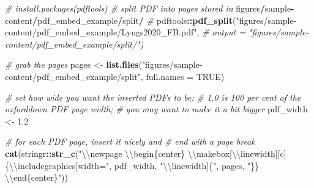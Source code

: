 \documentclass[a4paper, twoside]{templates/ociamthesis}
\newenvironment{Shaded}{\begin{snugshade}}{\end{snugshade}}
\newcommand{\CharTok}[1]{\textcolor[rgb]{0.31,0.60,0.02}{#1}}
\newcommand{\CommentTok}[1]{\textcolor[rgb]{0.56,0.35,0.01}{\textit{#1}}}
\newcommand{\DataTypeTok}[1]{\textcolor[rgb]{0.13,0.29,0.53}{#1}}
\newcommand{\FloatTok}[1]{\textcolor[rgb]{0.00,0.00,0.81}{#1}}
\newcommand{\KeywordTok}[1]{\textcolor[rgb]{0.13,0.29,0.53}{\textbf{#1}}}
\newcommand{\NormalTok}[1]{#1}
\newcommand{\OperatorTok}[1]{\textcolor[rgb]{0.81,0.36,0.00}{\textbf{#1}}}
\newcommand{\OtherTok}[1]{\textcolor[rgb]{0.56,0.35,0.01}{#1}}
\newcommand{\StringTok}[1]{\textcolor[rgb]{0.31,0.60,0.02}{#1}}
\renewenvironment{Shaded}
{
  \vspace{10pt}%
  \begin{snugshade}%
}{%
  \end{snugshade}%
  \vspace{8pt}%
}
\theoremstyle{definition}
\theoremstyle{definition}
\theoremstyle{definition}
\theoremstyle{definition}
\theoremstyle{remark}
\begin{document}
\begin{Shaded}
\begin{Highlighting}[]
\CommentTok{\# install.packages(pdftools)}
\CommentTok{\# split PDF into pages stored in}
\NormalTok{    figures}\OperatorTok{/}\NormalTok{sample}\OperatorTok{{-}}\NormalTok{content}\OperatorTok{/}\NormalTok{pdf\_embed\_example}\OperatorTok{/}\NormalTok{split}\OperatorTok{/}
\CommentTok{\#}
\StringTok{    }\NormalTok{pdftools}\OperatorTok{::}\KeywordTok{pdf\_split}\NormalTok{(}\StringTok{"figures/sample{-}content/pdf\_embed\_example/Lyngs2020\_FB.pdf"}\NormalTok{,}
\CommentTok{\# output = "figures/sample{-}content/pdf\_embed\_example/split/")}

\CommentTok{\# grab the pages}
\NormalTok{pages \textless{}{-}}\StringTok{ }\KeywordTok{list.files}\NormalTok{(}\StringTok{"figures/sample{-}content/pdf\_embed\_example/split"}\NormalTok{,}
    \DataTypeTok{full.names =} \OtherTok{TRUE}\NormalTok{)}

\CommentTok{\# set how wide you want the inserted PDFs to be:}
\CommentTok{\# 1.0 is 100 per cent of the oxforddown PDF page width;}
\CommentTok{\# you may want to make it a bit bigger}
\NormalTok{pdf\_width \textless{}{-}}\StringTok{ }\FloatTok{1.2}

\CommentTok{\# for each PDF page, insert it nicely and}
\CommentTok{\# end with a page break}
\KeywordTok{cat}\NormalTok{(stringr}\OperatorTok{::}\KeywordTok{str\_c}\NormalTok{(}\StringTok{"}\CharTok{\textbackslash{}\textbackslash{}}\StringTok{newpage }\CharTok{\textbackslash{}\textbackslash{}}\StringTok{begin\{center\}}
\StringTok{    }\CharTok{\textbackslash{}\textbackslash{}}\StringTok{makebox[}\CharTok{\textbackslash{}\textbackslash{}}\StringTok{linewidth][c]\{}\CharTok{\textbackslash{}\textbackslash{}}\StringTok{includegraphics[width="}\NormalTok{, pdf\_width,}
    \StringTok{"}\CharTok{\textbackslash{}\textbackslash{}}\StringTok{linewidth]\{"}\NormalTok{, pages, }\StringTok{"\}\} }\CharTok{\textbackslash{}\textbackslash{}}\StringTok{end\{center\}"}\NormalTok{))}
\end{Highlighting}
\end{Shaded}
\end{document}
